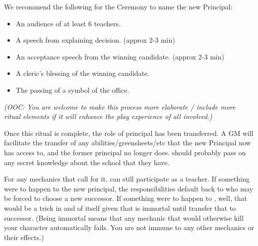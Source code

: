 \documentclass[green]{GL2020}
\begin{document}
We recommend the following for the Ceremony to name the new Principal:
\begin{itemize}
  \item An audience of at least 6 teachers.
  \item A speech from \cPrincipal{} explaining \cPrincipal{\their} decision. (approx 2-3 min)
  \item An acceptance speech from the winning candidate. (approx 2-3 min)
  \item A cleric’s blessing of the winning candidate.
  \item The passing of a symbol of the office.
\end{itemize}

\emph{(OOC: You are welcome to make this process more elaborate / include more ritual elements if it will enhance the play experience of all involved.)}

Once this ritual is complete, the role of principal has been transferred. A GM will facilitate the transfer of any abilities/greensheets/etc that the new Principal now has access to, and the former principal no longer does. \cPrincipal{} should probably pass on any secret knowledge about the school that they have. 

For any mechanics that call for it, \cPrincipal{} can still participate as a teacher. If something were to happen to the new principal, the responsibilities default back to \cPrincipal{} who may be forced to choose a new successor. If something were to happen to \cPrincipal{}, well, that would be a trick in and of itself given that \cPrincipal{} is immortal until \cPrincipal{\they} transfer\cPrincipal{\verbs} that to \cPrincipal{\their} successor. (Being immortal means that any mechanic that would otherwise kill your character automatically fails. You are not immune to any other mechanics or their effects.)
\end{document}
